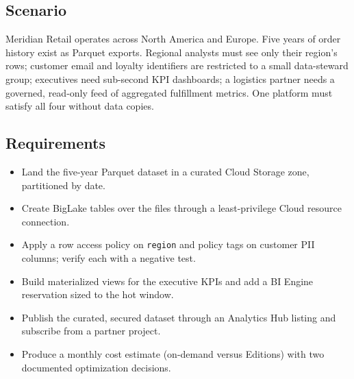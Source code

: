 \subsection*{Scenario}
Meridian Retail operates across North America and Europe. Five years of order history exist as Parquet exports. Regional analysts must see only their region's rows; customer email and loyalty identifiers are restricted to a small data-steward group; executives need sub-second KPI dashboards; a logistics partner needs a governed, read-only feed of aggregated fulfillment metrics. One platform must satisfy all four without data copies.

\subsection*{Requirements}
\begin{itemize}
    \item Land the five-year Parquet dataset in a curated Cloud Storage zone, partitioned by date.
    \item Create BigLake tables over the files through a least-privilege Cloud resource connection.
    \item Apply a row access policy on \texttt{region} and policy tags on customer PII columns; verify each with a negative test.
    \item Build materialized views for the executive KPIs and add a BI Engine reservation sized to the hot window.
    \item Publish the curated, secured dataset through an Analytics Hub listing and subscribe from a partner project.
    \item Produce a monthly cost estimate (on-demand versus Editions) with two documented optimization decisions.
\end{itemize}

